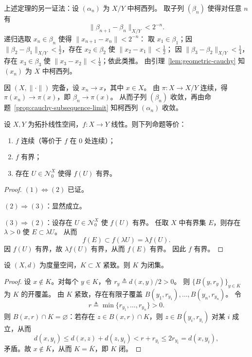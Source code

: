 \documentclass[lang=cn,a4paper,newtx,section]{elegantbook}
\begin{document}
\begin{remark}
  上述定理的另一证法：设 $(\alpha_n)$ 为 $X/Y$ 中柯西列。
  取子列 $(\beta_n)$ 使得对任意 $n$ 有
  \[
    \|\beta_{n+1}-\beta_n\|_{X/Y}<2^{-n}.
  \]
  递归选取 $x_n\in\beta_n$ 使得 $\|x_{n+1}-x_n\|<2^{-n}$：
  取 $x_1\in\beta_1$；因 $\|\beta_2-\beta_1\|_{X/Y}<\frac{1}{2}$，存在 $x_2\in\beta_2$ 使 $\|x_2-x_1\|<\frac{1}{2}$；
  因 $\|\beta_3-\beta_2\|_{X/Y}<\frac{1}{4}$，存在 $x_3\in\beta_3$ 使 $\|x_3-x_2\|<\frac{1}{4}$；依此类推。
  由引理~\ref{lem:geometric-cauchy} 知 $(x_n)$ 为 $X$ 中柯西列。

  因 $(X,\|\cdot\|)$ 完备，设 $x_n\to x$，其中 $x\in X$。
  由 $\pi:X\to X/Y$ 连续，得 $\pi(x_n)\to\pi(x)$，即 $\beta_n\to\pi(x)$。
  从而子列 $(\beta_n)$ 收敛，再由命题~\ref{prop:cauchy-subsequence-limit} 知柯西列 $(\alpha_n)$ 收敛。
\end{remark}

\begin{theorem}
  设 $X,Y$ 为拓扑线性空间，$f:X\to Y$ 线性。则下列命题等价：
  \begin{enumerate}
    \item $f$ 连续（等价于 $f$ 在 $0$ 处连续）；
    \item $f$ 有界；
    \item 存在 $U\in\mathcal{N}_0^X$ 使得 $f(U)$ 有界。
  \end{enumerate}
\end{theorem}

\begin{proof}
  $(1)\Leftrightarrow(2)$ 已证。

  $(2)\Rightarrow(3)$：显然成立。

  $(3)\Rightarrow(2)$：设存在 $U\in\mathcal{N}_0^X$ 使 $f(U)$ 有界。
  任取 $X$ 中有界集 $E$，则存在 $\lambda>0$ 使 $E\subset\lambda U$。
  从而
  \[
    f(E)\subset f(\lambda U)=\lambda f(U).
  \]
  因 $f(U)$ 有界，故 $\lambda f(U)$ 有界，从而 $f(E)$ 有界。
  因此 $f$ 有界。
\end{proof}

\begin{proposition}
  设 $(X,d)$ 为度量空间，$K\subset X$ 紧致。则 $K$ 为闭集。
\end{proposition}

\begin{proof}
  设 $x\notin K$。对每个 $y\in K$，令 $r_y\triangleq d(x,y)/2>0$。
  则 $\{B(y,r_y)\}_{y\in K}$ 为 $K$ 的开覆盖。
  由 $K$ 紧致，存在有限子覆盖 $B(y_1,r_{y_1}),\ldots,B(y_n,r_{y_n})$。
  令
  \[
    r\triangleq\min\{r_{y_1},\ldots,r_{y_n}\}>0.
  \]
  则 $B(x,r)\cap K=\varnothing$：若存在 $z\in B(x,r)\cap K$，则 $z\in B(y_i,r_{y_i})$ 对某 $i$ 成立，从而
  \[
    d(x,y_i)\le d(x,z)+d(z,y_i)<r+r_{y_i}\le 2r_{y_i}=d(x,y_i),
  \]
  矛盾。故 $x\notin\overline{K}$，从而 $K=\overline{K}$，即 $K$ 闭。
\end{proof}
\end{document}
